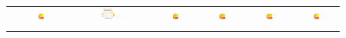 \documentclass[a4paper,11pt,twoside,openright]{book}							%
\begin{document}
\begin{landscape}
\begin{figure}
\begin{tabular}{lcccccc}
\parbox[t]{2mm}{}&
\includegraphics[trim=0cm 0cm 0cm 1.8cm,clip=true,width=0.19\textwidth,valign=t]{Immagini/simulazioni/REALEtempo2.png}&
\includegraphics[trim=0.8cm 0.8cm 2.5cm 1.2cm,clip=true,width=0.19\textwidth,valign=t]{Immagini/simulazioni/Dati_tempo2.png}&
\includegraphics[trim=0cm 0cm 0cm 1.8cm,clip=true,width=0.19\textwidth,valign=t]{Immagini/simulazioni/KRIGtempo2.png}&
\includegraphics[trim=0cm 0cm 0cm 1.8cm,clip=true,width=0.19\textwidth,valign=t]{Immagini/simulazioni/TPStempo2.png}&
\includegraphics[trim=0cm 0cm 0cm 1.8cm,clip=true,width=0.19\textwidth,valign=t]{Immagini/simulazioni/SOAPtempo2.png}&
\includegraphics[trim=0cm 0cm 0cm 1.8cm,clip=true,width=0.19\textwidth,valign=t]{Immagini/simulazioni/STSRtempo2.png}\\
\parbox[t]{2mm}{}&

\end{tabular}
\end{figure}
\end{landscape}
\end{document}

